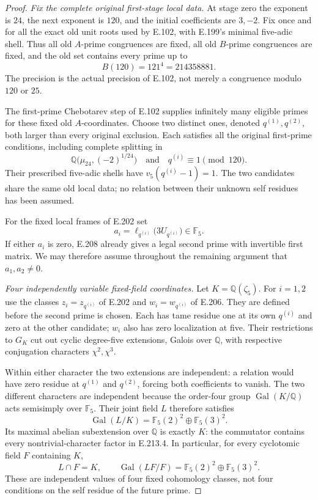\begin{proof}
\emph{Fix the complete original first-stage local data.}
At stage zero the exponent is $24$, the next exponent is $120$,
and the initial coefficients are $3,-2$. Fix once and for all
the exact old unit roots used by E.102, with E.199's minimal
five-adic shell. Thus all old $A$-prime congruences are fixed,
all old $B$-prime congruences are fixed, and the old set contains
every prime up to
\[
                         B(120)=121^4=214358881.
 \tag{E.213.1}
\]
The precision is the actual precision of E.102, not merely a
congruence modulo $120$ or $25$.

The first-prime Chebotarev step of E.102 supplies infinitely
many eligible primes for these fixed old $A$-coordinates.
Choose two distinct ones, denoted $q^{(1)},q^{(2)}$, both
larger than every original exclusion. Each satisfies all the
original first-prime conditions, including complete splitting
in
\[
       \mathbb Q\bigl(\mu_{24},(-2)^{1/24}\bigr)
 \quad\text{and}\quad q^{(i)}\equiv1\pmod{120}.
 \tag{E.213.2}
\]
Their prescribed five-adic shells have
$v_5(q^{(i)}-1)=1$. The two candidates share the same old
local data; no relation between their unknown self residues
has been assumed.

For the fixed local frames of E.202 set
\[
 a_i=\ell_{q^{(i)}}\bigl(3U_{q^{(i)}}\bigr)\in\mathbb F_5.
 \tag{E.213.3}
\]
If either $a_i$ is zero, E.208 already gives a legal second
prime with invertible first matrix. We may therefore assume
throughout the remaining argument that $a_1,a_2\ne0$.

\emph{Four independently variable fixed-field coordinates.}
Let $K=\mathbb Q(\zeta_5)$. For $i=1,2$ use the classes
$z_i=z_{q^{(i)}}$ of E.202 and $w_i=w_{q^{(i)}}$ of E.206.
They are defined before the second prime is chosen. Each has
tame residue one at its own $q^{(i)}$ and zero at the other
candidate; $w_i$ also has zero localization at five.
Their restrictions to $G_K$ cut out cyclic degree-five
extensions, Galois over $\mathbb Q$, with respective
conjugation characters $\chi^2,\chi^3$.

Within either character the two extensions are independent:
a relation would have zero residue at $q^{(1)}$ and
$q^{(2)}$, forcing both coefficients to vanish.
The two different characters are independent because the
order-four group $\operatorname{Gal}(K/\mathbb Q)$ acts
semisimply over $\mathbb F_5$. Their joint field $L$ therefore
satisfies
\[
 \operatorname{Gal}(L/K)
   =\mathbb F_5(2)^2\oplus\mathbb F_5(3)^2.                 \tag{E.213.4}
\]
Its maximal abelian subextension over $\mathbb Q$ is exactly
$K$: the commutator contains every nontrivial-character
factor in E.213.4. In particular, for every cyclotomic
field $F$ containing $K$,
\[
 L\cap F=K,\qquad
 \operatorname{Gal}(LF/F)
   =\mathbb F_5(2)^2\oplus\mathbb F_5(3)^2.                 \tag{E.213.5}
\]
These are independent values of four fixed cohomology classes,
not four conditions on the self residue of the future prime.


\end{proof}
